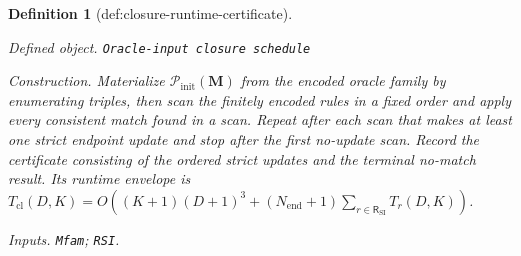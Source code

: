 \documentclass{article}
\newtheorem{definition}{Definition}
\begin{document}
\begin{definition}[def:closure-runtime-certificate]\label{def:closure-runtime-certificate}
\par\smallskip\noindent\emph{Defined object.} \texttt{Oracle-\allowbreak{}input closure schedule}
\par\smallskip\noindent\emph{Construction.} Materialize \(\mathcal P_{\mathrm{init}}(\mathbf M)\) from the encoded oracle family by enumerating triples, then scan the finitely encoded rules in a fixed order and apply every consistent match found in a scan. Repeat after each scan that makes at least one strict endpoint update and stop after the first no-update scan. Record the certificate consisting of the ordered strict updates and the terminal no-match result. Its runtime envelope is \(T_{\mathrm{cl}}(D,K)=O((K+1)(D+1)^3+(N_{\mathrm{end}}+1)\sum_{r\in\mathsf R_{\mathrm{SI}}}T_r(D,K))\).
\par\smallskip\noindent\emph{Inputs.} \texttt{Mfam}; \texttt{RSI}.
\end{definition}
\end{document}
